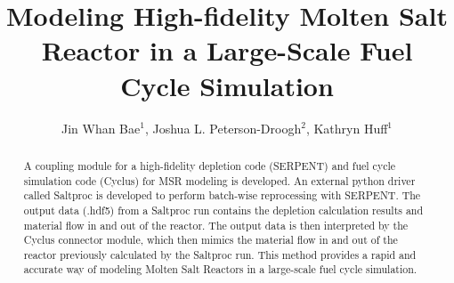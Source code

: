 \documentclass{elsarticle}
\begin{document}
\begin{frontmatter}

\title{Modeling High-fidelity Molten Salt Reactor in a Large-Scale Fuel Cycle Simulation}
\author{Jin Whan Bae$^{1}$, Joshua L. Peterson-Droogh$^{2}$, Kathryn Huff$^{1}$}
\address{$^{1}$Dept. of Nuclear, Plasma, and Radiological Engineering, University of Illinois at Urbana-Champaign, Urbana, IL \\ $^{2}$Oak Ridge National Laboratory, Oak Ridge, TN }

\begin{abstract}
A coupling module for a high-fidelity depletion code (SERPENT) and
fuel cycle simulation code (Cyclus) for \gls{MSR} modeling is developed.
An external python driver
called Saltproc is developed to perform batch-wise reprocessing with
SERPENT. The output data (.hdf5) from a Saltproc run contains the
depletion calculation results and material flow in and out of the
reactor. The output data is then interpreted by the Cyclus connector module,
which then mimics the material flow in and out of the reactor
previously calculated by the Saltproc run. This method provides
a rapid and accurate way of modeling Molten Salt Reactors in a
large-scale fuel cycle simulation. 
\end{abstract}

\end{frontmatter}

	









\end{document}
